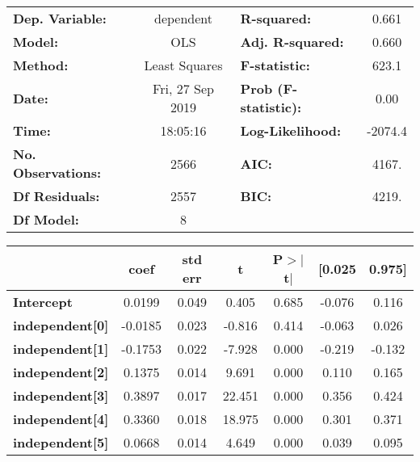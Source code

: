 \begin{center}
\begin{tabular}{lclc}
\toprule
\textbf{Dep. Variable:}    &    dependent     & \textbf{  R-squared:         } &     0.661   \\
\textbf{Model:}            &       OLS        & \textbf{  Adj. R-squared:    } &     0.660   \\
\textbf{Method:}           &  Least Squares   & \textbf{  F-statistic:       } &     623.1   \\
\textbf{Date:}             & Fri, 27 Sep 2019 & \textbf{  Prob (F-statistic):} &     0.00    \\
\textbf{Time:}             &     18:05:16     & \textbf{  Log-Likelihood:    } &   -2074.4   \\
\textbf{No. Observations:} &        2566      & \textbf{  AIC:               } &     4167.   \\
\textbf{Df Residuals:}     &        2557      & \textbf{  BIC:               } &     4219.   \\
\textbf{Df Model:}         &           8      & \textbf{                     } &             \\
\bottomrule
\end{tabular}
\begin{tabular}{lcccccc}
                        & \textbf{coef} & \textbf{std err} & \textbf{t} & \textbf{P$> |$t$|$} & \textbf{[0.025} & \textbf{0.975]}  \\
\midrule
\textbf{Intercept}      &       0.0199  &        0.049     &     0.405  &         0.685        &       -0.076    &        0.116     \\
\textbf{independent[0]} &      -0.0185  &        0.023     &    -0.816  &         0.414        &       -0.063    &        0.026     \\
\textbf{independent[1]} &      -0.1753  &        0.022     &    -7.928  &         0.000        &       -0.219    &       -0.132     \\
\textbf{independent[2]} &       0.1375  &        0.014     &     9.691  &         0.000        &        0.110    &        0.165     \\
\textbf{independent[3]} &       0.3897  &        0.017     &    22.451  &         0.000        &        0.356    &        0.424     \\
\textbf{independent[4]} &       0.3360  &        0.018     &    18.975  &         0.000        &        0.301    &        0.371     \\
\textbf{independent[5]} &       0.0668  &        0.014     &     4.649  &         0.000        &        0.039    &        0.095     \\

\end{tabular}
\end{center}
